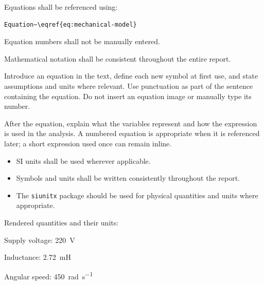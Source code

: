 {Equations shall be referenced using:

\begin{verbatim}
Equation~\eqref{eq:mechanical-model}
\end{verbatim}

Equation numbers shall not be manually entered.

Mathematical notation shall be consistent throughout the entire
report.


Introduce an equation in the text, define each new symbol at first
use, and state assumptions and units where relevant. Use punctuation
as part of the sentence containing the equation. Do not insert an
equation image or manually type its number.

\RegExample After the equation, explain what the variables represent
and how the expression is used in the analysis. A numbered equation
is appropriate when it is referenced later; a short expression used
once can remain inline.

\vspace{0.3cm}



\begin{itemize}[leftmargin=0.8cm, itemsep=3pt]

    \item SI units shall be used wherever applicable.

    \item Symbols and units shall be written consistently throughout
    the report.

    \item The \verb|siunitx| package should be used for physical
    quantities and units where appropriate.

\end{itemize}

\RegExample Rendered quantities and their units:

\begin{center}
    Supply voltage: \SI{220}{\volt}\par
    Inductance: \SI{2.72}{\milli\henry}\par
    Angular speed: \SI{450}{\radian\per\second}
\end{center}

}
